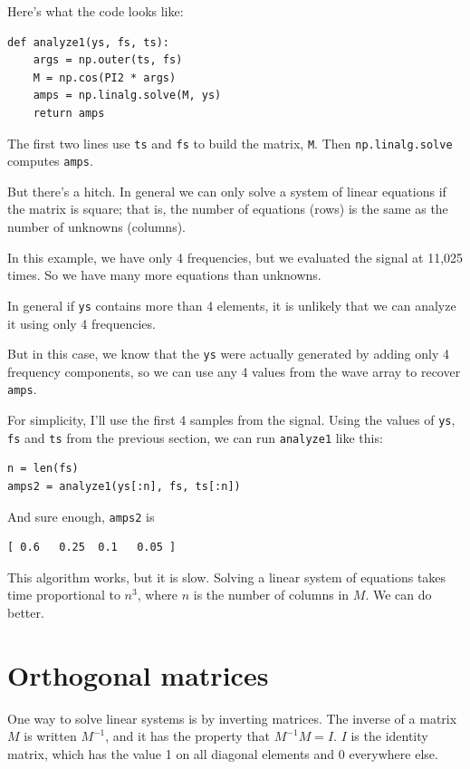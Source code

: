 \documentclass[12pt]{book}
\begin{document}
Here's what the code looks like:

\begin{verbatim}
def analyze1(ys, fs, ts):
    args = np.outer(ts, fs)
    M = np.cos(PI2 * args)
    amps = np.linalg.solve(M, ys)
    return amps
\end{verbatim}

The first two lines use {\tt ts} and {\tt fs} to build the
matrix, {\tt M}.  Then {\tt np.linalg.solve} computes {\tt amps}.

But there's a hitch.  In general we can only solve a system of linear
equations if the matrix is square; that is, the number of equations
(rows) is the same as the number of unknowns (columns).

In this example, we have only 4 frequencies, but we evaluated the
signal at 11,025 times.  So we have many more equations than unknowns.

In general if {\tt ys}
contains more than 4 elements, it is unlikely that we can analyze it
using only 4 frequencies.

But in this case, we know that the {\tt ys} were actually generated by
adding only 4 frequency components, so we can use any 4 values from
the wave array to recover {\tt amps}.

For simplicity, I'll use the first 4 samples from the signal.
Using the values of {\tt ys}, {\tt fs} and {\tt ts} from
the previous section, we can run {\tt analyze1} like this:

\begin{verbatim}
n = len(fs)
amps2 = analyze1(ys[:n], fs, ts[:n])
\end{verbatim}

And sure enough, {\tt amps2} is

\begin{verbatim}
[ 0.6   0.25  0.1   0.05 ]
\end{verbatim}

This algorithm works, but it is slow.  Solving a linear
system of equations takes time proportional to $n^3$, where $n$ is
the number of columns in $M$.  We can do better.


\section{Orthogonal matrices}

One way to solve linear systems is by inverting matrices.  The
inverse of a matrix $M$ is written $M^{-1}$, and it has the property
that $M^{-1}M = I$.  $I$ is the identity matrix, which has
the value 1 on all diagonal elements and 0 everywhere else.
\end{document}
